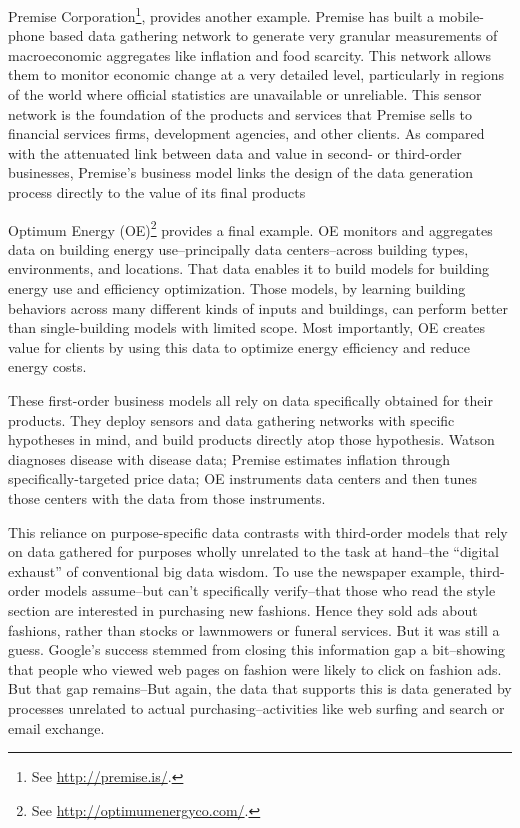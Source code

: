 \documentclass[12pt]{article}
\begin{document}
Premise Corporation\footnote{See \url{http://premise.is/}.}, provides another example. Premise has built a mobile-phone
based data gathering network to generate very granular measurements of
macroeconomic aggregates like inflation and food scarcity. This
network allows them to monitor economic change at a very detailed
level, particularly in regions of the world where official statistics
are unavailable or unreliable. This sensor network is the foundation
of the products and services that Premise sells to financial services
firms, development agencies, and other clients. As compared with the
attenuated link between data and value in second- or third-order
businesses, Premise's business model links the design of the data
generation process directly to the value of its final products

Optimum Energy (OE)\footnote{See \url{http://optimumenergyco.com/}.} provides a final example. OE monitors and
aggregates data on building energy use--principally data
centers--across building types, environments, and locations. That data
enables it to build models for building energy use and efficiency
optimization. Those models, by learning building behaviors across many
different kinds of inputs and buildings, can perform better than
single-building models with limited scope. Most importantly, OE
creates value for clients by using this data to optimize energy
efficiency and reduce energy costs.

These first-order business models all rely on data specifically
obtained for their products. They deploy sensors and data gathering
networks with specific hypotheses in mind, and build products directly
atop those hypothesis. Watson diagnoses disease with disease data;
Premise estimates inflation through specifically-targeted price data;
OE instruments data centers and then tunes those centers with the data
from those instruments.

This reliance on purpose-specific data contrasts with third-order
models that rely on data gathered for purposes wholly unrelated to the
task at hand--the ``digital exhaust'' of conventional big data
wisdom. To use the newspaper example, third-order models assume--but
can't specifically verify--that those who read the style section are
interested in purchasing new fashions. Hence they sold ads about
fashions, rather than stocks or lawnmowers or funeral services. But it
was still a guess. Google's success stemmed from closing this
information gap a bit--showing that people who viewed web pages on
fashion were likely to click on fashion ads. But that gap remains--But
again, the data that supports this is data generated by processes
unrelated to actual purchasing--activities like web surfing and search
or email exchange.
\end{document}
